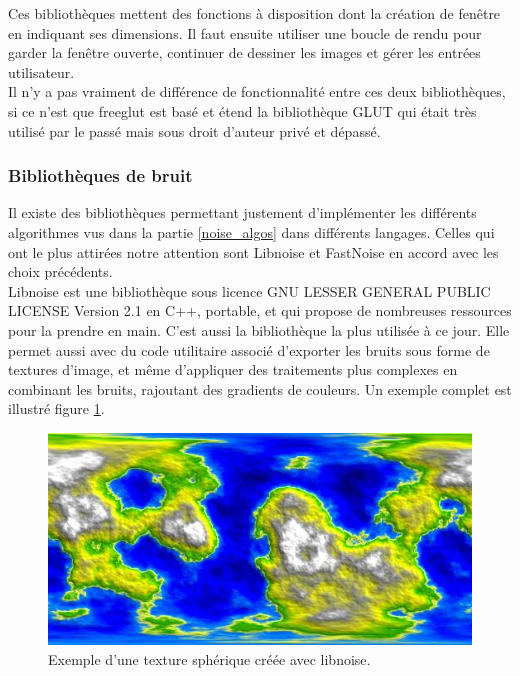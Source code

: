 \documentclass[a4paper]{article}
\begin{document}
    Ces bibliothèques mettent des fonctions à disposition dont la création de fenêtre en indiquant ses dimensions. Il faut ensuite utiliser une boucle de rendu pour garder la fenêtre ouverte, continuer de dessiner les images et gérer les entrées utilisateur.\\
    
    Il n'y a pas vraiment de différence de fonctionnalité entre ces deux bibliothèques, si ce n'est que freeglut est basé et étend la bibliothèque GLUT qui était très utilisé par le passé mais sous droit d'auteur privé et dépassé.

      
 \subsubsection{Bibliothèques de bruit}
    
    Il existe des bibliothèques permettant justement d'implémenter les différents algorithmes vus dans la partie \ref{noise_algos} dans différents langages.
    Celles qui ont le plus attirées notre attention sont Libnoise \cite{LibNoise} et FastNoise \cite{FastNoise} en accord avec les choix précédents.\\

    Libnoise est une bibliothèque sous licence GNU LESSER GENERAL PUBLIC LICENSE Version 2.1 en C++, portable, et qui propose de nombreuses ressources pour la prendre en main. C'est aussi la bibliothèque la plus utilisée à ce jour. Elle permet aussi avec du code utilitaire associé d'exporter les bruits sous forme de textures d'image, et même d'appliquer des traitements plus complexes en combinant les bruits, rajoutant des gradients de couleurs. Un exemple complet est illustré figure \ref{libnoiseExample}.\\
    
    \begin{figure}[!ht]
        \begin{center} \includegraphics[width=0.8\linewidth]{img/noise/libnoise_sphericalheightmap.jpg} \end{center}
        \caption{\label{libnoiseExample}Exemple d'une texture sphérique créée avec libnoise\protect\footnotemark .}
        \end{figure}
    
\end{document}
